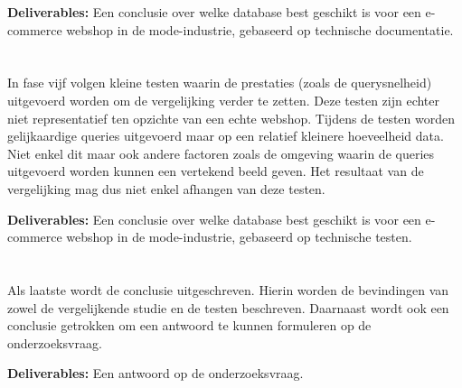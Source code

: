 \textbf{Deliverables:} Een conclusie over welke database best geschikt is voor een e-commerce webshop in de mode-industrie, gebaseerd op technische documentatie.

\section{}%
\label{sec:test}

In fase vijf volgen kleine testen waarin de prestaties (zoals de querysnelheid) uitgevoerd worden om de vergelijking verder te zetten. Deze testen zijn echter niet representatief ten opzichte van een echte webshop. Tijdens de testen worden gelijkaardige queries uitgevoerd maar op een relatief kleinere hoeveelheid data. Niet enkel dit maar ook andere factoren zoals de omgeving waarin de queries uitgevoerd worden kunnen een vertekend beeld geven. Het resultaat van de vergelijking mag dus niet enkel afhangen van deze testen.

\textbf{Deliverables:} Een conclusie over welke database best geschikt is voor een e-commerce webshop in de mode-industrie, gebaseerd op technische testen.

\section{}%
\label{sec:conclusie}

Als laatste wordt de conclusie uitgeschreven. Hierin worden de bevindingen van zowel de vergelijkende studie en de testen beschreven. Daarnaast wordt ook een conclusie getrokken om een antwoord te kunnen formuleren op de onderzoeksvraag.

\textbf{Deliverables:} Een antwoord op de onderzoeksvraag.
